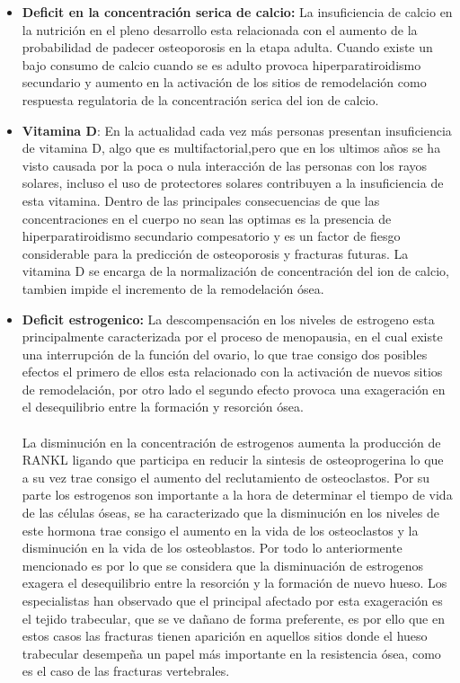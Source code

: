 \documentclass[letterpaper,12pt,oneside]{book}
\begin{document}
    \begin{itemize}
        \item \textbf{Deficit en la concentración serica de calcio:} La insuficiencia de calcio en la nutrición en el pleno desarrollo esta relacionada con el aumento de la probabilidad de padecer osteoporosis en la etapa adulta. Cuando existe un bajo consumo de calcio cuando se es adulto provoca hiperparatiroidismo secundario y aumento en la activación de los sitios de remodelación como respuesta regulatoria de la concentración serica del ion de calcio. 
        \item \textbf{Vitamina D}: En la actualidad cada vez más personas presentan insuficiencia de vitamina D, algo que es multifactorial,pero que en los ultimos años se ha visto causada por la poca o nula interacción de las personas con los rayos solares, incluso el uso de protectores solares contribuyen a la insuficiencia de esta vitamina. Dentro de las principales consecuencias de que las concentraciones en el cuerpo no sean las optimas es la presencia de hiperparatiroidismo secundario compesatorio y es un factor de fiesgo considerable para la predicción de osteoporosis y fracturas futuras. La vitamina D se encarga de la normalización de concentración del ion de calcio, tambien impide el incremento de la remodelación ósea. 
        \item \textbf{Deficit estrogenico:} La descompensación en los niveles de estrogeno esta principalmente caracterizada por el proceso de menopausia, en el cual existe una interrupción de la función del ovario, lo que trae consigo dos posibles efectos el primero de ellos esta relacionado con la activación de nuevos sitios de remodelación, por otro lado el segundo efecto provoca una exageración en el desequilibrio entre la formación y resorción ósea. \\ \\ La disminución en la concentración de estrogenos aumenta la producción de RANKL ligando que participa en reducir la sintesis de osteoprogerina lo que a su vez trae consigo el aumento del reclutamiento de osteoclastos. Por su parte los estrogenos son importante a la hora de determinar el tiempo de vida de las células óseas, se ha caracterizado que la disminución en los niveles de este hormona trae consigo el aumento en la vida de los osteoclastos y la disminución en la vida de los osteoblastos. Por todo lo anteriormente mencionado es por lo que se considera que la disminuación de estrogenos exagera el desequilibrio entre la resorción y la formación de nuevo hueso. Los especialistas han observado que el principal afectado por esta exageración es el tejido trabecular, que se ve dañano de forma preferente, es por ello que en estos casos las fracturas tienen aparición en aquellos sitios donde el hueso trabecular desempeña un papel más importante en la resistencia ósea, como es el caso de las fracturas vertebrales. 

\end{itemize}
\end{document}
